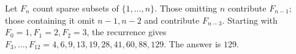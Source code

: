 Let $F_n$ count sparse subsets of $\{1,\ldots,n\}$. Those omitting $n$ contribute $F_{n-1}$; those containing it omit $n-1,n-2$ and contribute $F_{n-3}$. Starting with $F_0=1,F_1=2,F_2=3$, the recurrence gives $F_3,\ldots,F_{12}=4,6,9,13,19,28,41,60,88,129$. The answer is $\boxed{129}$.
